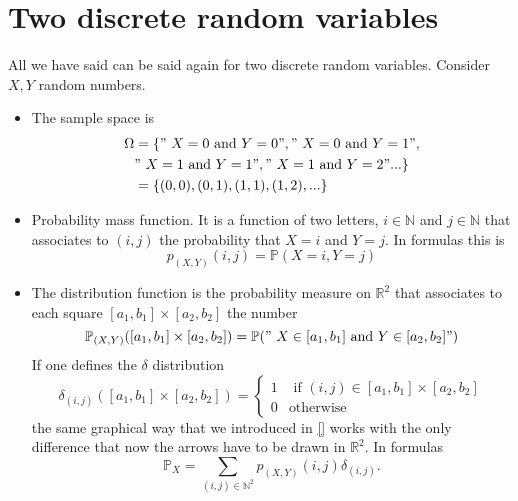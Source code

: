 \section{Two discrete random variables}
All we have said can be said again for two discrete random variables. Consider $X,Y$ random numbers. 
    \begin{itemize}
        \item The sample space is 
        \begin{equation}
            \begin{split}
        \Omega &=\{"\textrm{ $ X = 0 $ and $Y = 0 $}","\textrm{ $ X = 0 $ and $Y = 1 $}", \\
         & "\textrm{ $ X = 1 $ and $Y = 1 $}","\textrm{ $ X = 1 $ and $Y = 2 $}"...\}\\ & 
         = \{(0,0),(0,1),(1,1),(1,2),...\}
        \end{split}
        \end{equation}
        

    \item Probability mass function. It is a function of two letters, $i \in \mathbb N$ and $j\in \mathbb N$ that associates to $(i,j)$ the probability that $X = i$ and $Y = j$. In formulas this is 
    \begin{equation}
        \label{e:}
        p_{(X,Y)}(i,j) = \mathbb P(X = i, Y = j ) 
    \end{equation}
    \item The distribution function is the probability measure on $\mathbb R^2$ that associates to each square $[a_1,b_1] \times [a_2, b_2]$ the number 
    \begin{equation}
        \label{e:2d-distribution}
        \mathbb P_{(X,Y)}([a_1,b_1]\times [a_2,b_2]) = \mathbb P("\textrm{ $ X \in [a_1,b_1] $ and $Y \in [a_2,b_2] $}")
    \end{equation}
    If one defines the $\delta$ distribution 
        \begin{equation}
            \label{}
            \delta_{(i,j)}([a_1,b_1] \times [a_2,b_2]) = 
            \begin{cases}
            1 & \textrm{ if $(i,j ) \in [a_1,b_1]\times [a_2,b_2]$}\\
             0 & \textrm{otherwise}
            \end{cases}
        \end{equation}
        the same graphical way that we introduced in \eqref{} works with the only difference that now the arrows have to be drawn in $\mathbb R^2$. In formulas 
        \begin{equation}
            \label{}
            \mathbb P_X = \sum_{(i,j) \in \mathbb N^2} p_{(X,Y)}(i,j)\delta_{(i,j)}. 
        \end{equation}
    

\end{itemize}
